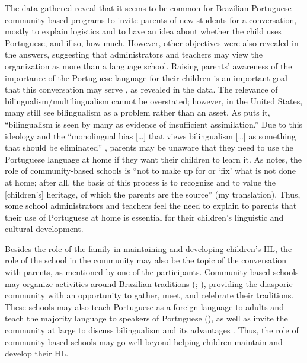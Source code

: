 \documentclass[output=paper]{langscibook}
\begin{document}
  The data gathered reveal that it seems to be common for Brazilian Portuguese community-based programs to invite parents of new students for a conversation, mostly to explain logistics and to have an idea about whether the child uses Portuguese, and if so, how much. However, other objectives were also revealed in the answers, suggesting that administrators and teachers may view the organization as more than a language school. Raising parents’ awareness of the importance of the Portuguese language for their children is an important goal that this conversation may serve \citep{Boruchowski2014}, as revealed in the data. The relevance of bilingualism/multilingualism cannot be overstated; however, in the United States, many still see bilingualism as a problem rather than an asset. As \citet[342]{Foster1982} puts it, “bilingualism is seen by many as evidence of insufficient assimilation.” Due to this ideology and the “monolingual bias [\ldots] that views bilingualism [\ldots] as something that should be eliminated” \citep[67]{Block2007}, parents may be unaware that they need to use the Portuguese language at home if they want their children to learn it. As \citet[224]{Lico2015} notes, the role of community-based schools is “not to make up for or ‘fix’ what is not done at home; after all, the basis of this process is to recognize and to value the [children’s] heritage, of which the parents are the source” (my translation). Thus, some school administrators and teachers feel the need to explain to parents that their use of Portuguese at home is essential for their children’s linguistic and cultural development.

Besides the role of the family in maintaining and developing children’s HL, the role of the school in the community may also be the topic of the conversation with parents, as mentioned by one of the participants. Community-based schools may organize activities around Brazilian traditions (\citealt{Quadros2017}; \citealt{Souza2017}), providing the diasporic community with an opportunity to gather, meet, and celebrate their traditions. These schools may also teach Portuguese as a foreign language to adults and teach the majority language to speakers of Portuguese (\citealt{GodoyLitran2017}), as well as invite the community at large to discuss bilingualism and its advantages \citep{Lira2017}. Thus, the role of community-based schools may go well beyond helping children maintain and develop their HL.
\end{document}
